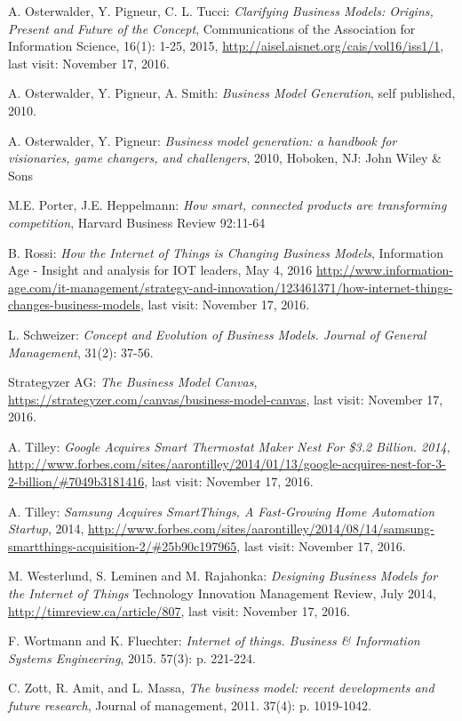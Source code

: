 \begin{thebibliography}{99}
	 A. Osterwalder, Y. Pigneur, C. L. Tucci: \emph{Clarifying Business Models: Origins, Present and Future of the Concept}, Communications of the Association for Information Science, 16(1): 1-25, 2015, \url{http://aisel.aisnet.org/cais/vol16/iss1/1}, last visit: November 17, 2016.

	 A. Osterwalder, Y. Pigneur, A. Smith: \emph{Business Model Generation}, self published, 2010.


	 A. Osterwalder, Y. Pigneur:  \emph{Business model generation: a handbook for visionaries, game changers, and challengers}, 2010, Hoboken, NJ: John Wiley \& Sons

 	 M.E. Porter, J.E. Heppelmann: \emph{How smart, connected products are transforming competition}, Harvard Business Review 92:11-64
	
	 B. Rossi: \emph{How the Internet of Things is Changing Business Models}, Information Age - Insight and analysis for IOT leaders, May 4, 2016 \url{http://www.information-age.com/it-management/strategy-and-innovation/123461371/how-internet-things-changes-business-models}, last visit: November 17, 2016.

	 L. Schweizer: \emph{Concept and Evolution of Business Models. Journal of General Management},  31(2): 37-56.

	 Strategyzer AG: \emph{The Business Model Canvas}, \url{https://strategyzer.com/canvas/business-model-canvas}, last visit: November 17, 2016.

 	  A. Tilley: \emph{Google Acquires Smart Thermostat Maker Nest For \$3.2 Billion. 2014}, \url{http://www.forbes.com/sites/aarontilley/2014/01/13/google-acquires-nest-for-3-2-billion/#7049b3181416}, last visit: November 17, 2016.

 	  A. Tilley: \emph{Samsung Acquires SmartThings, A Fast-Growing Home Automation Startup}, 2014, \url{http://www.forbes.com/sites/aarontilley/2014/08/14/samsung-smartthings-acquisition-2/#25b90c197965}, last visit: November 17, 2016.

	 M. Westerlund, S. Leminen and M. Rajahonka: \emph{Designing Business Models for the Internet of Things} Technology Innovation Management Review, July 2014, \url{http://timreview.ca/article/807}, last visit: November 17, 2016.

	 F. Wortmann and K. Fluechter: \emph{Internet of things. Business \& Information Systems Engineering}, 2015. 57(3): p. 221-224.

	 C. Zott, R. Amit, and L. Massa, \emph{The business model: recent developments and future research}, Journal of management, 2011. 37(4): p. 1019-1042. 
 \end{thebibliography}

